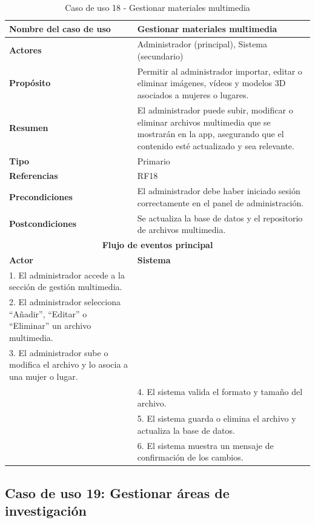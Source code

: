 \begin{table}[H]
\centering
\caption{Caso de uso 18 - Gestionar materiales multimedia}
\begin{tabular}{|p{4.5cm}|p{10.5cm}|}
\hline
\textbf{Nombre del caso de uso} & Gestionar materiales multimedia \\
\hline
\textbf{Actores} & Administrador (principal), Sistema (secundario) \\
\hline
\textbf{Propósito} & Permitir al administrador importar, editar o eliminar imágenes, vídeos y modelos 3D asociados a mujeres o lugares. \\
\hline
\textbf{Resumen} & El administrador puede subir, modificar o eliminar archivos multimedia que se mostrarán en la app, asegurando que el contenido esté actualizado y sea relevante. \\
\hline
\textbf{Tipo} & Primario \\
\hline
\textbf{Referencias} & RF18 \\
\hline
\textbf{Precondiciones} & El administrador debe haber iniciado sesión correctamente en el panel de administración. \\
\hline
\textbf{Postcondiciones} & Se actualiza la base de datos y el repositorio de archivos multimedia. \\
\hline
\multicolumn{2}{|c|}{\textbf{Flujo de eventos principal}} \\
\hline
\textbf{Actor} & \textbf{Sistema} \\
\hline
1. El administrador accede a la sección de gestión multimedia. & \\
\hline
2. El administrador selecciona “Añadir”, “Editar” o “Eliminar” un archivo multimedia. & \\
\hline
3. El administrador sube o modifica el archivo y lo asocia a una mujer o lugar. & \\
\hline
& 4. El sistema valida el formato y tamaño del archivo. \\
\hline
& 5. El sistema guarda o elimina el archivo y actualiza la base de datos. \\
\hline
& 6. El sistema muestra un mensaje de confirmación de los cambios. \\
\hline
\end{tabular}
\end{table}


\clearpage
\subsection{Caso de uso 19: Gestionar áreas de investigación}

